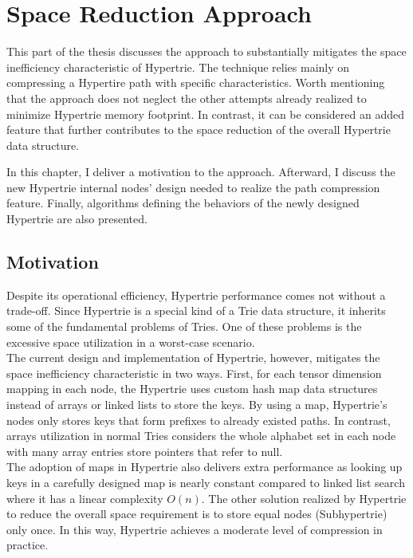 \chapter{Space Reduction Approach}
\label{ch:approach}

This part of the thesis discusses the approach to substantially mitigates the space inefficiency characteristic of Hypertrie.  
The technique relies mainly on compressing a Hypertire path with specific characteristics. 
Worth mentioning that the approach does not neglect the other attempts already realized to minimize Hypertrie memory footprint. 
In contrast, it can be considered an added feature that further contributes to the space reduction of the overall Hypertrie data structure. 


In this chapter, I deliver a motivation to the approach. Afterward, I discuss the new Hypertrie internal nodes' design needed to realize the path compression feature. Finally, algorithms defining the behaviors of the newly designed Hypertrie are also presented. 


\section{Motivation}

Despite its operational efficiency, Hypertrie performance comes not without a trade-off. 
Since Hypertrie is a special kind of a Trie data structure, it inherits some of the fundamental problems of  Tries. 
One of these problems is the excessive space utilization in a worst-case scenario.  \\


The current design and implementation of Hypertrie, however, mitigates the space inefficiency characteristic in two ways. 
First, for each tensor dimension mapping in each node, the Hypertrie uses custom hash map data structures instead of arrays or linked lists to store the keys. 
By using a map, Hypertrie's nodes only stores keys that form prefixes to already existed paths. 
In contrast, arrays utilization in normal Tries considers the whole alphabet set in each node with many array entries store pointers that refer to null.  \\

The adoption of maps in Hypertrie also delivers extra performance as looking up keys in a carefully designed map is nearly constant compared to linked list search where it has a linear complexity $O(n)$. 
The other solution realized by Hypertrie to reduce the overall space requirement is to store equal nodes (Subhypertrie) only once. In this way, Hypertrie achieves a moderate level of compression in practice. \\

